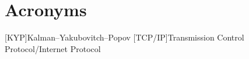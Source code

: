 \chapter{Acronyms}

\begin{acronym}
  [KYP]{Kalman--Yakubovitch--Popov}
  [TCP/IP]{Transmission Control Protocol/Internet Protocol}
\end{acronym}
